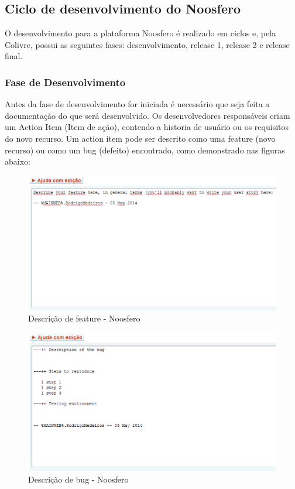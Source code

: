 \subsection{Ciclo de desenvolvimento do Noosfero}
%
O desenvolvimento para a plataforma Noosfero é realizado em ciclos e, pela Colivre, 
possui as seguintes fases: desenvolvimento, release 1, release 2 e release final.
%
\subsubsection{Fase de Desenvolvimento}
%
Antes da fase de desenvolvimento for iniciada é necessário que seja feita a 
documentação do que será desenvolvido. Os desenvolvedores responsáveis criam um 
Action Item (Item de ação), contendo a historia de usuário ou os requisitos do novo 
recurso. Um action item pode ser descrito como uma feature (novo recurso) ou como 
um bug (defeito) encontrado, como demonstrado nas figuras abaixo:
%
\begin{figure}
    \centering
    \includegraphics[keepaspectratio=true,scale=0.65]
      {figuras/noosfero_feature.eps}
    \caption{Descrição de feature - Noosfero}
    \label{noosfero_feature}
\end{figure}
%
\begin{figure}
    \centering
    \includegraphics[keepaspectratio=true,scale=0.65]
      {figuras/noosfero_bug.eps}
    \caption{Descrição de bug - Noosfero}
    \label{noosfero_bug}
\end{figure}

